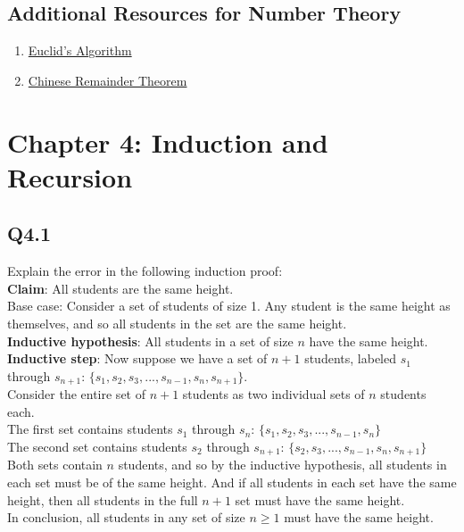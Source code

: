 \documentclass{article}
\begin{document}
\subsection*{Additional Resources for Number Theory}
\begin{enumerate}
    \item \href{https://www.youtube.com/watch?v=yHwneN6zJmU}{Euclid's Algorithm}
    \item \href{https://www.youtube.com/watch?v=ru7mWZJlRQg&t=276s}{Chinese Remainder Theorem} 
\end{enumerate}
\newpage
{}
\section*{Chapter 4: Induction and Recursion}
\subsection*{Q4.1}
Explain the error in the following induction proof:
\\ \textbf{Claim}: All students are the same height.
\\ Base case: Consider a set of students of size 1. Any student is the same height as themselves, and so all students in the set are the same height.
\\ \textbf{Inductive hypothesis}: All students in a set of size $n$ have the same height. 
\\ \textbf{Inductive step}: Now suppose we have a set of $n+1$ students, labeled $s_1$ through $s_{n+1}$: $\{s_1,s_2,s_3,...,s_{n-1},s_n,s_{n+1}\}$.
\\ Consider the entire set of $n+1$ students as two individual sets of $n$ students each.
\\ The first set contains students $s_1$ through $s_n$: $\{s_1,s_2,s_3,...,s_{n-1},s_n\}$
\\ The second set contains students $s_2$ through $s_{n+1}$: $\{s_2,s_3,...,s_{n-1},s_n,s_{n+1}\}$
\\ Both sets contain $n$ students, and so by the inductive hypothesis, all students in each set must be of the same height. And if all students in each set have the same height, then all students in the full $n+1$ set must have the same height.
\\ In conclusion, all students in any set of size $n\geq1$ must have the same height.
\newpage
{}
\end{document}
